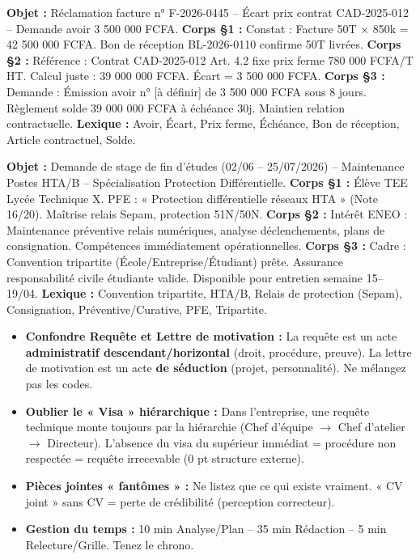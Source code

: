 \documentclass[11pt]{article}
\begin{document}
\begin{corrige}
\textbf{Objet :} Réclamation facture n° F-2026-0445 -- Écart prix contrat CAD-2025-012 -- Demande avoir 3 500 000 FCFA.
\textbf{Corps §1 :} Constat : Facture 50T $\times$ 850k = 42 500 000 FCFA. Bon de réception BL-2026-0110 confirme 50T livrées.
\textbf{Corps §2 :} Référence : Contrat CAD-2025-012 Art. 4.2 fixe prix ferme 780 000 FCFA/T HT. Calcul juste : 39 000 000 FCFA. Écart = 3 500 000 FCFA.
\textbf{Corps §3 :} Demande : Émission avoir n° [à définir] de 3 500 000 FCFA sous 8 jours. Règlement solde 39 000 000 FCFA à échéance 30j. Maintien relation contractuelle.
\textbf{Lexique :} Avoir, Écart, Prix ferme, Échéance, Bon de réception, Article contractuel, Solde.
\end{corrige}

\begin{corrige}
\textbf{Objet :} Demande de stage de fin d'études (02/06 -- 25/07/2026) -- Maintenance Postes HTA/B -- Spécialisation Protection Différentielle.
\textbf{Corps §1 :} Élève TEE Lycée Technique X. PFE : « Protection différentielle réseaux HTA » (Note 16/20). Maîtrise relais Sepam, protection 51N/50N.
\textbf{Corps §2 :} Intérêt ENEO : Maintenance préventive relais numériques, analyse déclenchements, plans de consignation. Compétences immédiatement opérationnelles.
\textbf{Corps §3 :} Cadre : Convention tripartite (École/Entreprise/Étudiant) prête. Assurance responsabilité civile étudiante valide. Disponible pour entretien semaine 15--19/04.
\textbf{Lexique :} Convention tripartite, HTA/B, Relais de protection (Sepam), Consignation, Préventive/Curative, PFE, Tripartite.
\end{corrige}

\begin{attention}
\begin{itemize}
    \item \textbf{Confondre Requête et Lettre de motivation :} La requête est un acte \textbf{administratif descendant/horizontal} (droit, procédure, preuve). La lettre de motivation est un acte \textbf{de séduction} (projet, personnalité). Ne mélangez pas les codes.
    \item \textbf{Oublier le « Visa » hiérarchique :} Dans l'entreprise, une requête technique monte toujours par la hiérarchie (Chef d'équipe $\rightarrow$ Chef d'atelier $\rightarrow$ Directeur). L'absence du visa du supérieur immédiat = procédure non respectée = requête irrecevable (0 pt structure externe).
    \item \textbf{Pièces jointes « fantômes » :} Ne listez que ce qui existe vraiment. « CV joint » sans CV = perte de crédibilité (perception correcteur).
    \item \textbf{Gestion du temps :} 10 min Analyse/Plan -- 35 min Rédaction -- 5 min Relecture/Grille. Tenez le chrono.
\end{itemize}
\end{attention}
\end{document}
